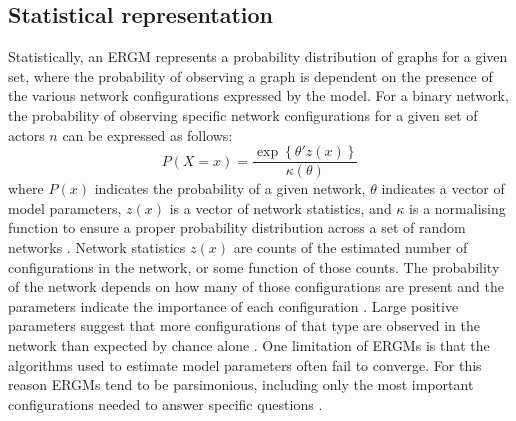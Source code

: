 \subsection{Statistical representation}

Statistically, an ERGM represents a probability distribution of graphs for a given set, where the probability of observing a graph is dependent on the presence of the various network configurations expressed by the model. For a binary network, the probability of observing specific network configurations for a given set of actors \(n\) can be expressed as follows: $$ P(X = x) = \frac{\exp \left \{ \theta'z(x)  \right \}}{\kappa (\theta )} $$ where $P(x)$ indicates the probability of a given network, $\theta$ indicates a vector of model parameters, $z(x)$ is a vector of network statistics, and $\kappa$ is a normalising function to ensure a proper probability distribution across a set of random networks \citep{shumate2010exponential}. Network statistics $z(x)$ are counts of the estimated number of configurations in the network, or some function of those counts. The probability of the network depends on how many of those configurations are present and the parameters indicate the importance of each configuration \citep{lusher2013exponential}. Large positive parameters suggest that more configurations of that type are observed in the network than expected by chance alone \citep{robins2009closure}. One limitation of ERGMs is that the algorithms used to estimate model parameters often fail to converge. For this reason ERGMs tend to be parsimonious, including only the most important configurations needed to answer specific questions \citep{mcallister2017balancing}. \medskip

